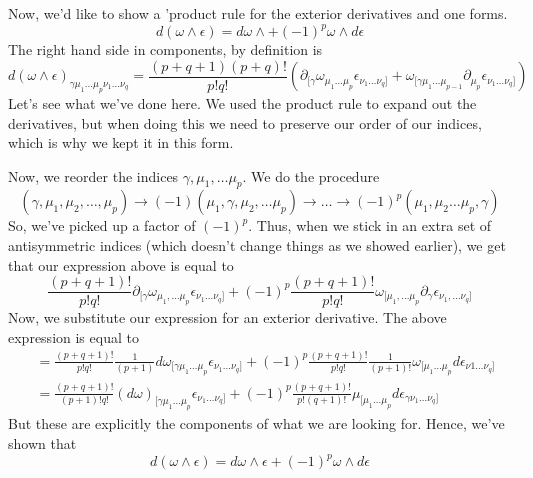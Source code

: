 \documentclass[11pt, a4paper]{article}   	%
\theoremstyle{slplain}
\begin{document}
Now, we'd like to show a 'product rule for the exterior  
derivatives and one forms. 
\[
d (\omega  \wedge  \epsilon )  = d\omega  \wedge  + ( -1) ^{ p } \omega  \wedge  d \epsilon  
\] The right hand side in components, 
by definition is 
\[
	d (  \omega  \wedge  \epsilon)_{\gamma \mu_1 \dots \mu_{p } \nu_1 \dots \nu_{ q } } = \frac{ ( p + q + 1 ) ( p + q ) ! 	 }{ p ! q ! } \left( \partial_{ [ \gamma } \omega _{ \mu_1 \dots \mu_{ p } } \epsilon_{ \nu_1 \dots \nu_{ q } ] }  + \omega _{ [ \gamma \mu_1 \dots \mu_{ p - 1 } } \partial_{ \mu_{ p  }  } \epsilon_{ \nu_1 \dots \nu_{ q   } ]  } \right)   
\] Let's see what we've done here. 
We used the product rule to expand out the derivatives, 
but when doing this we need to preserve our order of 
our indices, which is why we kept it in this form. 

Now, we reorder the indices $ \gamma, \mu_1 , \dots \mu_{ p} $. 
We do the procedure 
\[
( \gamma, \mu_1, \mu_2 , \dots , \mu_{p } ) \to ( -1 ) ( \mu_1 , \gamma , \mu_2 , \dots \mu_{ p } ) \to \dots \to ( -1)^{ p } ( \mu_1 , \mu_2 \dots \mu_{ p }, \gamma ) 
\] 
So, we've picked up a factor of $ ( - 1)^{ p }$. 
Thus, when we stick in an extra set of antisymmetric 
indices (which doesn't change things as we showed earlier), 
we get that our expression above is equal to  
\[
\frac{ ( p + q + 1 )! }{ p ! q !  } \partial_{ [ \gamma  } \omega  _{ \mu_1 , \dots \mu_{ p }   } \epsilon_{ \nu_1 \dots \nu_{ q } ] } + ( -1)^{ p } \frac{ ( p + q + 1 )! }{ p ! q !  } \omega _{ [ \mu_1 , \dots \mu_{ p } } \partial_{  \gamma  } \epsilon_{ \nu_{1 }, \dots \nu_{q } ]} 
\] Now, we substitute our expression for an 
exterior derivative. 
The above expression is equal to 
\begin{align*}
 & = \frac{ ( p + q + 1 )! }{ p ! q ! } \frac{1}{ ( p + 1 ) } d\omega _{  [ \gamma \mu_1 \dots \mu_{ p } } \epsilon_{ \nu_1 \dots \nu_{ q } ] } +  ( - 1) ^{ p }\frac{ ( p + q + 1 ) !}{ p ! q ! } \frac{1}{ ( p + 1 ) ! } \omega _{ [ \mu_1 \dots \mu _{ p } } d \epsilon_{ \nu 1 \dots \nu _{ q } ]    } \\
 &= \frac{ ( p + q + 1 )! }{ ( p  + 1 ) ! q ! } ( d \omega)_{ [ \gamma \mu_1 \dots \mu_{ p } } \epsilon_{ \nu_1 \dots \nu_{ q  } ]  }  +  ( - 1)^ p \frac{ ( p + q + 1 ) ! }{ p ! ( q + 1 ) ! } \mu_{ [ \mu_1 \dots \mu _{ p }  } d \epsilon_{ \gamma \nu_1 \dots \nu_{ q } ] }
\end{align*} 
But these are explicitly the components of what we 
are looking for. Hence, we've shown that 
\[
d ( \omega  \wedge  \epsilon )  = d \omega \wedge  \epsilon + ( - 1)^ p  \omega  \wedge  d \epsilon 
\] 
\end{document}
